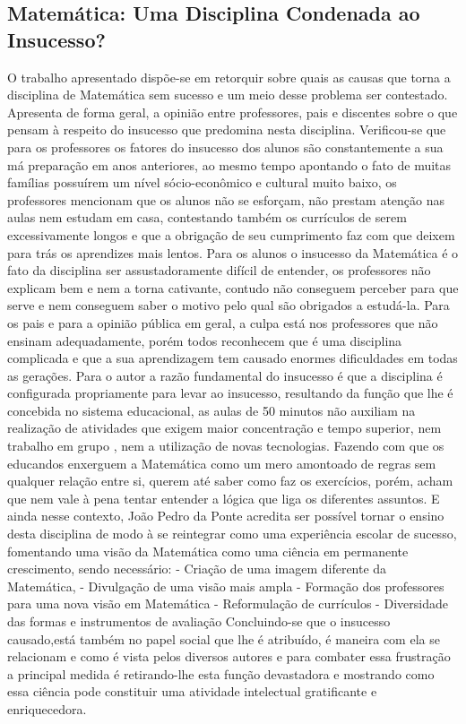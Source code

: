 \documentclass[12pt,a4paper]{article}
\begin{document}
\subsection{Matemática: Uma Disciplina Condenada ao Insucesso?}
O trabalho apresentado dispõe-se em retorquir sobre quais as causas que torna a disciplina de Matemática sem sucesso e um meio desse problema ser contestado. Apresenta de forma geral, a opinião entre professores, pais e discentes sobre o que pensam à respeito do insucesso que predomina nesta disciplina.
Verificou-se que para os professores os fatores do insucesso dos alunos são constantemente a sua má preparação em anos anteriores, ao mesmo tempo apontando o fato de muitas famílias possuírem um nível sócio-econômico e cultural muito baixo, os professores mencionam que os alunos não se esforçam, não prestam atenção nas aulas nem estudam em casa, contestando também os currículos de serem excessivamente longos e que a obrigação de seu cumprimento faz com que deixem para trás os aprendizes  mais lentos. 
Para os alunos o insucesso da Matemática é o fato da disciplina ser assustadoramente difícil de entender, os professores não explicam bem e nem a torna cativante, contudo não conseguem perceber para que serve e nem conseguem saber o motivo pelo qual são obrigados a estudá-la.
Para os pais e para a opinião pública em geral, a culpa está nos professores que não ensinam adequadamente, porém todos reconhecem que é uma disciplina complicada e que a sua aprendizagem tem causado enormes dificuldades em todas as gerações. 
Para o autor a razão fundamental do insucesso é que a disciplina é configurada propriamente para levar ao insucesso, resultando da função que lhe é concebida no sistema educacional, as aulas de 50 minutos não auxiliam na realização de atividades que exigem maior concentração e tempo superior, nem trabalho em grupo , nem a utilização de novas tecnologias. Fazendo com que os educandos enxerguem a Matemática como um mero amontoado de regras sem qualquer relação entre si, querem até saber como faz os exercícios, porém, acham que nem vale à pena tentar entender a lógica que liga os diferentes assuntos. 
E ainda nesse contexto, João Pedro da Ponte acredita ser possível tornar o ensino desta disciplina de modo à se reintegrar como uma experiência escolar de sucesso, fomentando uma visão da Matemática como uma ciência em permanente crescimento, sendo necessário: 
- Criação de uma imagem diferente da Matemática,
- Divulgação de uma visão mais ampla 
- Formação dos professores para uma nova visão em Matemática 
- Reformulação de currículos 
- Diversidade das formas e instrumentos de avaliação 
Concluindo-se que o insucesso causado,está também no papel social que lhe é atribuído, é maneira com ela se relacionam e como é vista pelos diversos autores e para combater essa frustração a principal medida é retirando-lhe esta função devastadora e mostrando como essa ciência pode constituir uma atividade intelectual gratificante e enriquecedora. 
\end{document}
